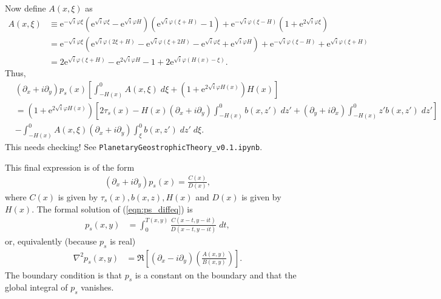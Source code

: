 \documentclass[10pt]{amsart}
\begin{document}
Now define $A(x,\xi)$ as
\begin{align}
A(x,\xi) & \equiv \mathrm{e}^{-\sqrt{i} \varphi \xi} 
\left(
\mathrm{e}^{\sqrt{i} \varphi \xi} - 
\mathrm{e}^{\sqrt{i} \varphi H} 
\right) \left(
\mathrm{e}^{\sqrt{i} \varphi  \left( \xi + H \right)} - 1
\right) + \mathrm{e}^{-\sqrt{i} \varphi (\xi - H)  } 
\left( 1 + \mathrm{e}^{2 \sqrt{i} \varphi \xi}\right)   \nonumber \\
& =
\mathrm{e}^{-\sqrt{i} \varphi \xi} 
\left(
\mathrm{e}^{\sqrt{i} \varphi \left(2 \xi + H \right)} - 
\mathrm{e}^{\sqrt{i} \varphi \left(\xi + 2 H\right)}
- 
\mathrm{e}^{\sqrt{i} \varphi \xi} +
\mathrm{e}^{\sqrt{i} \varphi H} 
\right) + \mathrm{e}^{-\sqrt{i} \varphi (\xi - H)  }  + 
 \mathrm{e}^{\sqrt{i} \varphi \left( \xi + H \right)} \nonumber \\
& =
2 \mathrm{e}^{\sqrt{i} \varphi \left(\xi + H \right)} - 
\mathrm{e}^{2 \sqrt{i} \varphi  H}
- 
1 +
2 \mathrm{e}^{\sqrt{i} \varphi \left(H(x) - \xi\right)} 
\nonumber .
  \end{align}
  Thus,
 \begin{align}
& 
 \left( \partial_x  + i \partial_y  \right) p_s (x) \left[ \int_{-H(x)}^{0} 
A(x,\xi) \; d \xi    + 
 \left(1 + \mathrm{e}^{2 \sqrt{i} \varphi H(x )} \right)
H(x) \right] \nonumber \\
& = 
\left(1 + \mathrm{e}^{2 \sqrt{i} \varphi H(x )} \right)
\left[ 
2 \tau_s (x) 
 - H(x) \left( \partial_x + i \partial_y  \right)
 \int_{-H(x)}^{0} b(x,z') \; dz'
 +  \left( \partial_y  + i \partial_x  \right)
 \int_{-H(x)}^0 z' b(x,z') \; dz'
 \right]
\nonumber \\
 & -  \int_{-H(x)}^{0} 
A(x, \xi)
 \left( \partial_x  + i \partial_y  \right)
 \int_{\xi}^{0} b(x,z') \; dz' 
 \; d \xi   \nonumber .
\end{align}  
This needs checking!  See \texttt{PlanetaryGeostrophicTheory\_v0.1.ipynb}.

This final expression is of the form
\begin{align}
 \left( \partial_x  + i \partial_y  \right) p_s (x) = \frac{C(x)}{D(x)} ,
 \label{eqn:ps_diffeq}
\end{align}
where $C(x)$ is given by $\tau_s(x), b(x, z), H(x)$ and $D(x)$ is given by $H(x)$.
The formal solution of (\ref{eqn:ps_diffeq}) is
\begin{align}
p_s(x,y) & = \int_0^{T(x,y)} \frac{C(x -t, y - i t)}{D(x -t, y - i t)} \; dt ,
\end{align}
or, equivalently (because $p_s$ is real)
\begin{align}
\nabla^2 p_s(x,y) & = \Re \left[ \left( \partial_x - i \partial_y \right) \left( \frac{A(x,y)}{B(x,y)} \right) \right] .
\end{align}
The boundary condition is that $p_s$ is a constant on the boundary and that the global integral of $p_s$ vanishes.
\end{document}
